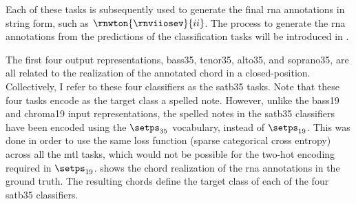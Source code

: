 Each of these tasks is subsequently used to generate the
final \gls{rna} annotations in string form, such as
$\rnwton{\rnviiosev}{ii}$. The process to generate the
\gls{rna} annotations from the predictions of the
classification tasks will be introduced in
. 

The first four output representations, \gls{bass35},
\gls{tenor35}, \gls{alto35}, and \gls{soprano35}, are all
related to the realization of the annotated chord in a
\gls{closed-position}. Collectively, I refer to these four
classifiers as the \gls{satb35} tasks. Note that these four
tasks encode as the target class a spelled note. However,
unlike the \gls{bass19} and \gls{chroma19} input
representations, the spelled notes in the \gls{satb35}
classifiers have been encoded using the $\setps_{35}$
vocabulary, instead of $\setps_{19}$. This was done in order
to use the same loss function (sparse categorical cross
entropy) across all the \gls{mtl} tasks, which would not be
possible for the two-hot encoding required in $\setps_{19}$.
 shows the chord realization of the
\gls{rna} annotations in the ground truth. The resulting
chords define the target class of each of the four
\gls{satb35} classifiers.

